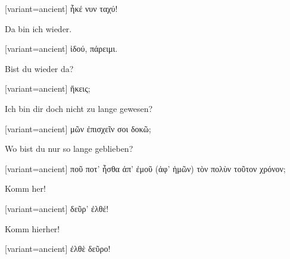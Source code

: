 \begin{greek}[variant=ancient]%
ἧκέ νυν ταχύ!

\end{greek}%
\switchcolumn*

Da bin ich wieder.

\switchcolumn

\begin{greek}[variant=ancient]%
ἰδού, πάρειμι.

\end{greek}%
\switchcolumn*

Bist du wieder da?

\switchcolumn

\begin{greek}[variant=ancient]%
ἥκεις;

\end{greek}%
\switchcolumn*

Ich bin dir doch nicht zu lange gewesen?

\switchcolumn

\begin{greek}[variant=ancient]%
μῶν ἐπισχεῖν σοι δοκῶ;

\end{greek}%
\switchcolumn*

Wo bist du nur so lange geblieben?

\switchcolumn

\begin{greek}[variant=ancient]%
ποῦ ποτ' ἦσθα ἀπ' ἐμοῦ (ἀφ' ἡμῶν) τὸν πολὺν τοῦτον χρόνον;

\end{greek}%
\indent Komm her!

\switchcolumn

\begin{greek}[variant=ancient]%
δεῦρ' ἐλθέ!

\end{greek}%
\switchcolumn*

Komm hierher!

\switchcolumn

\begin{greek}[variant=ancient]%
ἐλθὲ δεῦρο!

\end{greek}%
\switchcolumn*

